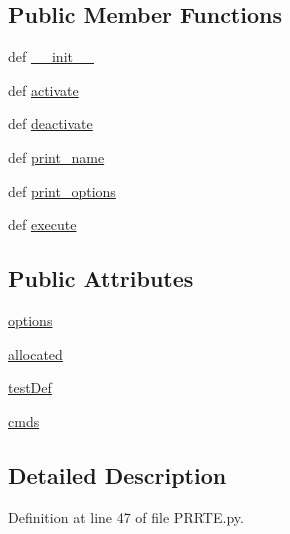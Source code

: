 \subsection*{Public Member Functions}
\begin{DoxyCompactItemize}
\item 
def \hyperlink{class_p_r_r_t_e_1_1_p_r_r_t_e_aab163ee5630ff741ddebce1f1a19dca6}{\-\_\-\-\_\-init\-\_\-\-\_\-}
\item 
def \hyperlink{class_p_r_r_t_e_1_1_p_r_r_t_e_aeb7fdaa1719c5203dc652ab0e09e208b}{activate}
\item 
def \hyperlink{class_p_r_r_t_e_1_1_p_r_r_t_e_a4ec48744745fb0829800dcfad01af45f}{deactivate}
\item 
def \hyperlink{class_p_r_r_t_e_1_1_p_r_r_t_e_a9531d7035e6acc2d9bcdd6e74e8d81f7}{print\-\_\-name}
\item 
def \hyperlink{class_p_r_r_t_e_1_1_p_r_r_t_e_aebd413e4294d6b247a3436557273f1c3}{print\-\_\-options}
\item 
def \hyperlink{class_p_r_r_t_e_1_1_p_r_r_t_e_aaf98bda8f91b9654255df6dd8ca90309}{execute}
\end{DoxyCompactItemize}
\subsection*{Public Attributes}
\begin{DoxyCompactItemize}
\item 
\hyperlink{class_p_r_r_t_e_1_1_p_r_r_t_e_a174321352f6234d4704b9a980574bdc7}{options}
\item 
\hyperlink{class_p_r_r_t_e_1_1_p_r_r_t_e_aa61e5452cb21084ebe29fddecf96b63e}{allocated}
\item 
\hyperlink{class_p_r_r_t_e_1_1_p_r_r_t_e_a797f27c656051565b7897358a7c28a40}{test\-Def}
\item 
\hyperlink{class_p_r_r_t_e_1_1_p_r_r_t_e_ac33721f4ed5d701613528962b88e16e3}{cmds}
\end{DoxyCompactItemize}


\subsection{Detailed Description}


Definition at line 47 of file P\-R\-R\-T\-E.\-py.




